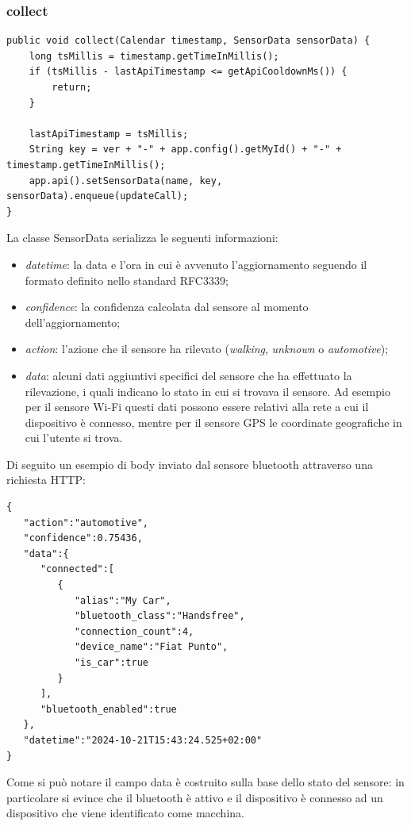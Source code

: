 \subsubsection{collect}
\begin{verbatim}
public void collect(Calendar timestamp, SensorData sensorData) {
    long tsMillis = timestamp.getTimeInMillis();
    if (tsMillis - lastApiTimestamp <= getApiCooldownMs()) {
        return;
    }

    lastApiTimestamp = tsMillis;
    String key = ver + "-" + app.config().getMyId() + "-" + timestamp.getTimeInMillis();
    app.api().setSensorData(name, key, sensorData).enqueue(updateCall);
}
\end{verbatim}
La classe SensorData serializza le seguenti informazioni:
\begin{itemize}
    \item \textit{datetime}: la data e l'ora in cui è avvenuto l'aggiornamento seguendo il formato definito nello standard RFC3339\cite{ref:RFC3339};
    \item \textit{confidence}: la confidenza calcolata dal sensore al momento dell'aggiornamento;
    \item \textit{action}: l'azione che il sensore ha rilevato (\textit{walking}, \textit{unknown} o \textit{automotive});
    \item \textit{data}: alcuni dati aggiuntivi specifici del sensore che ha effettuato la rilevazione, i quali indicano lo stato in cui si trovava il sensore. Ad esempio per il sensore Wi-Fi questi dati possono essere relativi alla rete a cui il dispositivo è connesso, mentre per il sensore GPS le coordinate geografiche in cui l'utente si trova.
\end{itemize}
Di seguito un esempio di body inviato dal sensore bluetooth attraverso una richiesta HTTP:
\begin{verbatim}
{
   "action":"automotive",
   "confidence":0.75436,
   "data":{
      "connected":[
         {
            "alias":"My Car",
            "bluetooth_class":"Handsfree",
            "connection_count":4,
            "device_name":"Fiat Punto",
            "is_car":true
         }
      ],
      "bluetooth_enabled":true
   },
   "datetime":"2024-10-21T15:43:24.525+02:00"
}
\end{verbatim}
Come si può notare il campo data è costruito sulla base dello stato del sensore: in particolare si evince che il bluetooth è attivo e il dispositivo è connesso ad un dispositivo che viene identificato come macchina.

